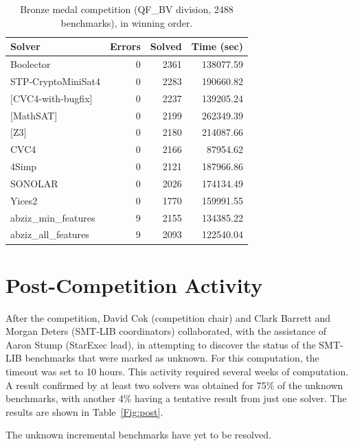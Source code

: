 \documentclass[twoside,11pt]{article}
\begin{document}
\begin{table}
\caption{Bronze medal competition (QF\_BV division, 2488 benchmarks), in winning order.}
\label{Table:bronze}
\centering
\begin{tabular}{|l|rrr|}
\hline
 Solver & Errors & Solved & Time (sec)\\
\hline
Boolector &	0  &		2361  &		138077.59 \\
STP-CryptoMiniSat4 & 0  &		2283  &		190660.82 	\\
{[}CVC4-with-bugfix] &	0  &		2237 	 &		139205.24 \\
{[}MathSAT]  &	0  &		2199 	 &		262349.39 \\
{[}Z3]  & 	0  &		2180 	 &		214087.66 	\\
CVC4  &	0  &		2166 	 &		87954.62 	\\
4Simp &	0 &	2121 	 &		187966.86 \\
SONOLAR &	0  &		2026  &	 	174134.49 \\
Yices2 &	0  &		1770  &	 	159991.55 \\
abziz\_min\_features &	9  &		2155 	 &	 	134385.22 \\
abziz\_all\_features &	9  &		2093 	 &	 	122540.04 \\
\hline
\end{tabular}
\end{table}

\section{Post-Competition Activity}
\label{sec:post}

After the competition, David Cok (competition chair) and Clark Barrett and Morgan Deters (SMT-LIB coordinators) collaborated, with the assistance of Aaron Stump (StarExec lead), in attempting to discover the status of the SMT-LIB benchmarks that were marked as unknown. For this computation, the timeout was set to 10 hours. This activity required several weeks of computation. A result confirmed by at least two solvers was obtained for 75\% of the unknown benchmarks, with another 4\% having a tentative result from just one solver.
The results are shown in Table~\ref{Fig:post}.

The unknown incremental benchmarks have yet to be resolved.
\end{document}
